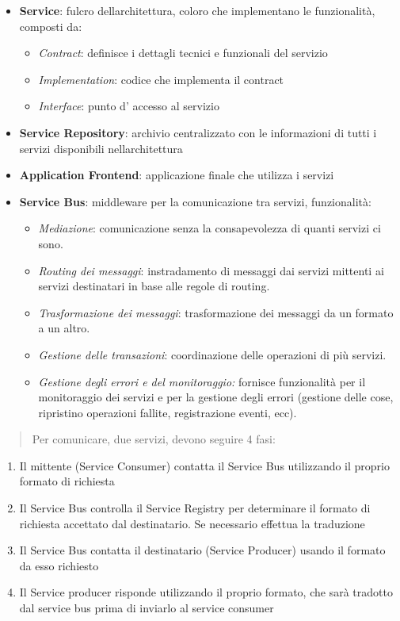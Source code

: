 \begin{itemize}
\item
  \textbf{Service}: fulcro dell\textquotesingle architettura, coloro che
  implementano le funzionalità, composti da:

  \begin{itemize}
  \item
    \emph{Contract}: definisce i dettagli tecnici e funzionali del
    servizio
  \item
    \emph{Implementation}: codice che implementa il contract
  \item
    \emph{Interface}: punto d' accesso al servizio
  \end{itemize}
\item
  \textbf{Service Repository}: archivio centralizzato con le
  informazioni di tutti i servizi disponibili
  nell\textquotesingle architettura
\item
  \textbf{Application Frontend}: applicazione finale che utilizza i
  servizi
\item
  \textbf{Service Bus}: middleware per la comunicazione tra servizi,
  funzionalità:

  \begin{itemize}
  \item
    \emph{Mediazione}: comunicazione senza la consapevolezza di quanti
    servizi ci sono.
  \item
    \emph{Routing dei messaggi}: instradamento di messaggi dai servizi
    mittenti ai servizi destinatari in base alle regole di routing.
  \item
    \emph{Trasformazione dei messaggi}: trasformazione dei messaggi da
    un formato a un altro.
  \item
    \emph{Gestione delle transazioni}: coordinazione delle operazioni di
    più servizi.
  \item
    \emph{Gestione degli errori e del monitoraggio:} fornisce
    funzionalità per il monitoraggio dei servizi e per la gestione degli
    errori (gestione delle cose, ripristino operazioni fallite,
    registrazione eventi, ecc).
  \end{itemize}
\end{itemize}

\begin{quote}
Per comunicare, due servizi, devono seguire 4 fasi:
\end{quote}

\begin{enumerate}
\def\labelenumi{\arabic{enumi}.}
\item
  Il mittente (Service Consumer) contatta il Service Bus utilizzando il
  proprio formato di richiesta
\item
  Il Service Bus controlla il Service Registry per determinare il
  formato di richiesta accettato dal destinatario. Se necessario
  effettua la traduzione
\item
  Il Service Bus contatta il destinatario (Service Producer) usando il
  formato da esso richiesto
\item
  Il Service producer risponde utilizzando il proprio formato, che sarà
  tradotto dal service bus prima di inviarlo al service consumer
\end{enumerate}

